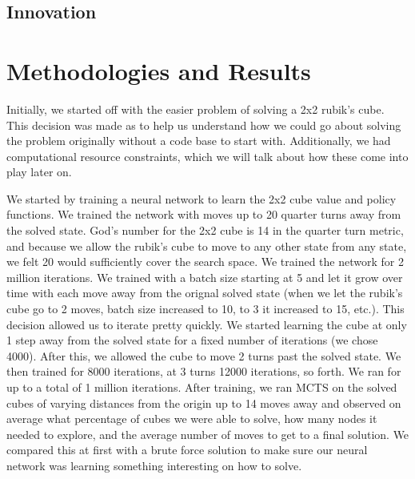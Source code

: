 \documentclass[10pt,twocolumn,letterpaper]{article}
\begin{document}
\subsection{Innovation}


\section{Methodologies and Results}

Initially, we started off with the easier problem of solving a 2x2 rubik's cube. This decision was made as to help us understand how we could go about solving the problem originally without a code base to start with. Additionally, we had computational resource constraints, which we will talk about how these come into play later on.

We started by training a neural network to learn the 2x2 cube value and policy functions. We trained the network with moves up to 20 quarter turns away from the solved state. God's number for the 2x2 cube is 14 in the quarter turn metric, and because we allow the rubik's cube to move to any other state from any state, we felt 20 would sufficiently cover the search space. We trained the network for 2 million iterations. We trained with a batch size starting at 5 and let it grow over time with each move away from the orignal solved state (when we let the rubik's cube go to 2 moves, batch size increased to 10, to 3 it increased to 15, etc.). This decision allowed us to iterate pretty quickly.  We started learning the cube at only 1 step away from the solved state for a fixed number of iterations (we chose 4000). After this, we allowed the cube to move 2 turns past the solved state. We then trained for 8000 iterations, at 3 turns 12000 iterations, so forth. We ran for up to a total of 1 million iterations. After training, we ran MCTS on the solved cubes of varying distances from the origin up to 14 moves away and observed on average what percentage of cubes we were able to solve, how many nodes it needed to explore, and the average number of moves to get to a final solution. We compared this at first with a brute force solution to make sure our neural network was learning something interesting on how to solve. 
\end{document}
